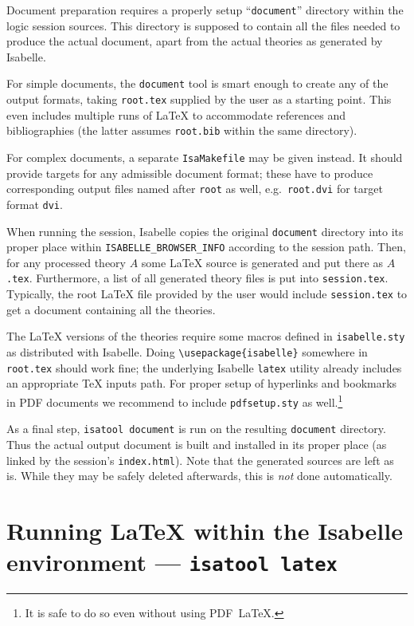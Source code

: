 \medskip Document preparation requires a properly setup ``\texttt{document}''
directory within the logic session sources.  This directory is supposed to
contain all the files needed to produce the actual document, apart from the
actual theories as generated by Isabelle.

\medskip For simple documents, the \texttt{document} tool is smart enough to
create any of the output formats, taking \texttt{root.tex} supplied by the
user as a starting point.  This even includes multiple runs of {\LaTeX} to
accommodate references and bibliographies (the latter assumes
\texttt{root.bib} within the same directory).

For complex documents, a separate \texttt{IsaMakefile} may be given instead.
It should provide targets for any admissible document format; these have to
produce corresponding output files named after \texttt{root} as well, e.g.\ 
\texttt{root.dvi} for target format \texttt{dvi}.

\medskip When running the session, Isabelle copies the original
\texttt{document} directory into its proper place within
\texttt{ISABELLE_BROWSER_INFO} according to the session path.  Then, for any
processed theory $A$ some {\LaTeX} source is generated and put there as
$A$\texttt{.tex}.  Furthermore, a list of all generated theory files is put
into \texttt{session.tex}.  Typically, the root {\LaTeX} file provided by the
user would include \texttt{session.tex} to get a document containing all the
theories.

The {\LaTeX} versions of the theories require some macros defined in
\texttt{isabelle.sty} as distributed with Isabelle.  Doing
\verb,\usepackage{isabelle}, somewhere in \texttt{root.tex} should work fine;
the underlying Isabelle \texttt{latex} utility already includes an appropriate
{\TeX} inputs path.  For proper setup of hyperlinks and bookmarks in PDF
documents we recommend to include \verb,pdfsetup.sty, as well.\footnote{It is
  safe to do so even without using PDF~\LaTeX.}

\medskip As a final step, \texttt{isatool document} is run on the resulting
\texttt{document} directory.  Thus the actual output document is built and
installed in its proper place (as linked by the session's
\texttt{index.html}).  Note that the generated sources are left as is.  While
they may be safely deleted afterwards, this is \emph{not} done automatically.


\section{Running {\LaTeX} within the Isabelle environment --- \texttt{isatool latex}}
\label{sec:tool-latex}

